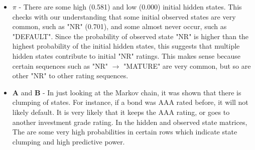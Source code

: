 \documentclass[a4paper, 11pt]{article}
\begin{document}
\begin{itemize}
	\item $\pi$ -  There are some high (0.581) and low (0.000) initial hidden states. This checks with our understanding that some initial observed states are very common, such as "NR" (0.701), and some almost never occur, such as "DEFAULT". Since the probability of observed state "NR" is higher than the highest probability of the initial hidden states, this suggests that multiple hidden states contribute to initial "NR" ratings. This makes sense because certain sequences such as "NR" $\longrightarrow$ "MATURE" are very common, but so are other "NR" to other rating sequences.
	\item $ \mathbf{A}$ and $ \mathbf{B}$ - In just looking at the Markov chain, it was shown that there is clumping of states. For instance, if a bond was AAA rated before, it will not likely default. It is very likely that it keeps the AAA rating, or goes to another investment grade rating. In the hidden and observed state matrices, The are some very high probabilities in certain rows which indicate state clumping and high predictive power.
\end{itemize}

	\small{}



	\tiny{}

\begin{landscape}
	\tiny{}

\end{landscape}
\end{document}
